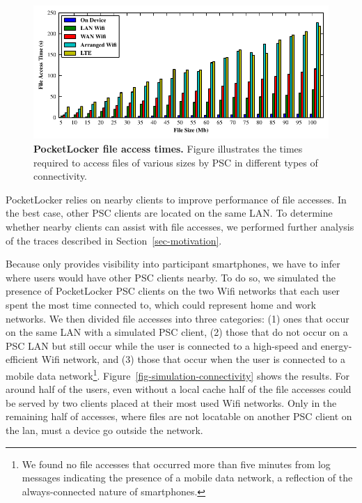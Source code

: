 \begin{figure}[t]
  \centering
  \includegraphics{./figures/downloadtimes.pdf}
  
  \vspace*{-0.1in}

  \caption{\small \textbf{PocketLocker file access times.} Figure
    illustrates the
    times required to access files of various sizes by PSC in different
    types of
  connectivity.}

  \label{fig-evaluation-download}
  
  \vspace*{0.05in}


  \vspace*{-0.2in}

\end{figure}

PocketLocker relies on nearby clients to improve performance of file accesses.
In the best case, other PSC clients are located on the same LAN. To determine
whether nearby clients can assist with file accesses, we performed further
analysis of the traces described in Section~\ref{sec-motivation}.

Because \PhoneLab{} only provides visibility into participant smartphones, we
have to infer where users would have other PSC clients nearby. To do so, we
simulated the presence of PocketLocker PSC clients on the two Wifi networks
that each user spent the most time connected to, which could represent home
and work networks. We then divided file accesses into three categories: (1)
ones that occur on the same LAN with a simulated PSC client, (2) those that
do not occur on a PSC LAN but still occur while the user is connected to a
high-speed and energy-efficient Wifi network, and (3) those that occur when
the user is connected to a mobile data network\footnote{We found no file
  accesses that occurred more than five minutes from log messages indicating
  the presence of a mobile data network, a reflection of the always-connected
nature of smartphones.}. Figure~\ref{fig-simulation-connectivity} shows the
results. For around half of the users, even without a local cache half of the
file accesses could be served by two clients placed at their most used Wifi
networks. Only in the remaining half of accesses, where files are not locatable
on another PSC client on the lan, must a device go outside the network.

